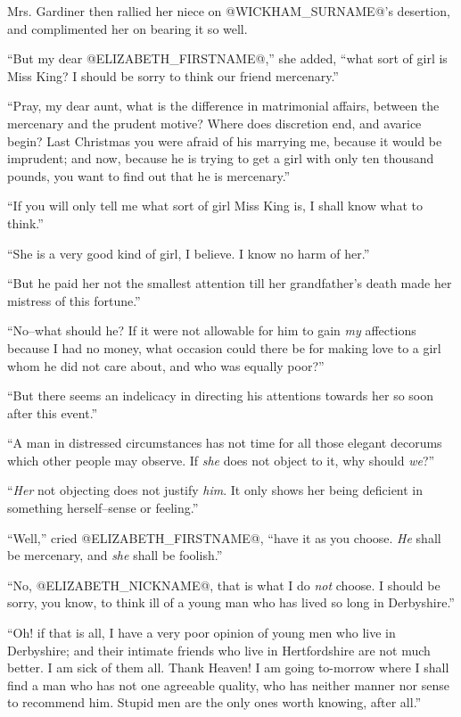 Mrs. Gardiner then rallied her niece on @WICKHAM_SURNAME@'s desertion, and
complimented her on bearing it so well.

``But my dear @ELIZABETH_FIRSTNAME@,'' she added, ``what sort of girl is Miss King? I
should be sorry to think our friend mercenary.''

``Pray, my dear aunt, what is the difference in matrimonial affairs,
between the mercenary and the prudent motive? Where does discretion end,
and avarice begin? Last Christmas you were afraid of his marrying me,
because it would be imprudent; and now, because he is trying to get
a girl with only ten thousand pounds, you want to find out that he is
mercenary.''

``If you will only tell me what sort of girl Miss King is, I shall know
what to think.''

``She is a very good kind of girl, I believe. I know no harm of her.''

``But he paid her not the smallest attention till her grandfather's death
made her mistress of this fortune.''

``No--what should he? If it were not allowable for him to gain \textit{my}
affections because I had no money, what occasion could there be for
making love to a girl whom he did not care about, and who was equally
poor?''

``But there seems an indelicacy in directing his attentions towards her
so soon after this event.''

``A man in distressed circumstances has not time for all those elegant
decorums which other people may observe. If \textit{she} does not object to it,
why should \textit{we}?''

``\textit{Her} not objecting does not justify \textit{him}. It only shows her being
deficient in something herself--sense or feeling.''

``Well,'' cried @ELIZABETH_FIRSTNAME@, ``have it as you choose. \textit{He} shall be
mercenary, and \textit{she} shall be foolish.''

``No, @ELIZABETH_NICKNAME@, that is what I do \textit{not} choose. I should be sorry, you know,
to think ill of a young man who has lived so long in Derbyshire.''

``Oh! if that is all, I have a very poor opinion of young men who live in
Derbyshire; and their intimate friends who live in Hertfordshire are not
much better. I am sick of them all. Thank Heaven! I am going to-morrow
where I shall find a man who has not one agreeable quality, who has
neither manner nor sense to recommend him. Stupid men are the only ones
worth knowing, after all.''

